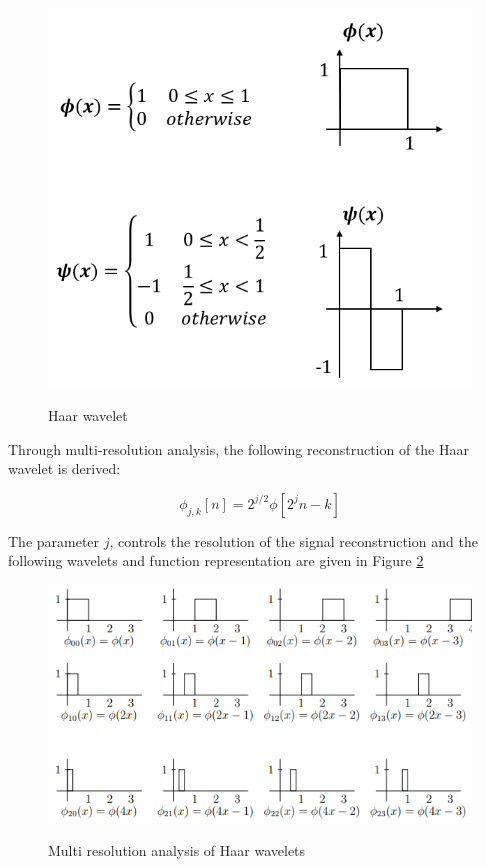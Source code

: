 \begin{figure}
\centering
  \includegraphics[width=14cm]{thesis/images/haar.png}\\
  \caption{Haar wavelet} \label{haar}
\end{figure}

Through multi-resolution analysis, the following reconstruction of the Haar wavelet is derived:

\begin{equation}
   \phi_{j,k}[n]=2^{j/2}\phi[2^jn-k]
    \label{app1_04_mres}
\end{equation}

The parameter $j$, controls the resolution of the signal reconstruction and the following wavelets and function representation are given in Figure \ref{multires}

\begin{figure}
\centering
  \includegraphics[width=14cm]{thesis/images/multires.png}\\
  \caption{Multi resolution analysis of Haar wavelets} \label{multires}
\end{figure}
